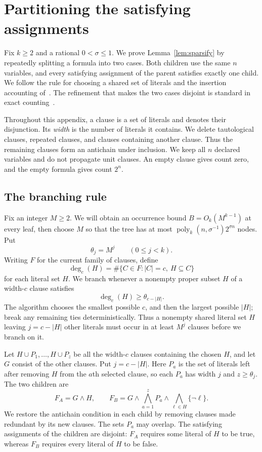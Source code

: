 \documentclass[11pt,reqno]{amsart}
\numberwithin{equation}{section}
\theoremstyle{definition}\newtheorem{definition}[theorem]{Definition}
\theoremstyle{remark}\newtheorem{remark}[theorem]{Remark}
\newcommand{\poly}{\operatorname{poly}}
\renewcommand{\le}{\leqslant}
\renewcommand{\ge}{\geqslant}
\begin{document}
\appendix

\section{Partitioning the satisfying assignments}\label{app:sparsify}

Fix $k\ge2$ and a rational $0<\sigma\le1$.
We prove Lemma~\ref{lem:sparsify} by repeatedly splitting a formula
into two cases. Both children use the same $n$ variables, and every
satisfying assignment of the parent satisfies exactly one child.
We follow the rule for choosing a shared set of literals and the
insertion accounting of~\cite[Section~6]{CIP}.
The refinement that makes the two cases disjoint is standard in exact
counting~\cite[Appendix~A]{DHMTW}.

Throughout this appendix, a clause is a set of literals and denotes their
disjunction. Its \emph{width} is the number of literals it contains.
We delete tautological clauses, repeated clauses, and clauses
containing another clause. Thus the remaining clauses form an antichain
under inclusion. We keep all $n$ declared variables and do not propagate
unit clauses. An empty clause gives count zero, and the empty formula gives
count $2^n$.

\subsection{The branching rule}

Fix an integer $M\ge2$. We will obtain an occurrence bound
$B=O_k(M^{k-1})$ at every leaf, then choose $M$ so that the tree has
at most $\poly_k(n,\sigma^{-1})2^{\sigma n}$ nodes. Put
\[
 \theta_j=M^j\qquad(0\le j<k).
\]
Writing $F$ for the current family of clauses, define
\[
 \deg_c(H)=\#\{C\in F:|C|=c,\ H\subseteq C\}
\]
for each literal set $H$. We branch whenever a nonempty proper subset
$H$ of a width-$c$ clause satisfies
\begin{equation}\label{eq:spar-violation}
 \deg_c(H)\ge\theta_{c-|H|}.
\end{equation}
The algorithm chooses the smallest possible $c$, and then the largest possible $|H|$;
break any remaining ties deterministically.
Thus a nonempty shared literal set $H$ leaving $j=c-|H|$ other
literals must occur in at least $M^j$ clauses before we branch on it.

Let $H\cup P_1,\ldots,H\cup P_z$ be all the width-$c$ clauses containing
the chosen $H$, and let $G$ consist of the other clauses. Put
$j=c-|H|$. Here $P_a$ is the set of literals left after removing
$H$ from the $a$th selected clause, so each $P_a$ has width $j$
and $z\ge\theta_j$.
The two children are
\begin{equation}\label{eq:spar-children}
 F_A=G\wedge H,\qquad
 F_B=G\wedge\bigwedge_{a=1}^zP_a
          \wedge\bigwedge_{\ell\in H}\{\neg\ell\}.
\end{equation}
We restore the antichain condition in each child by removing
clauses made redundant by its new clauses.
The sets $P_a$ may overlap.
The satisfying assignments of the children are disjoint:
$F_A$ requires some literal of $H$ to be true, whereas $F_B$
requires every literal of $H$ to be false.
\end{document}
